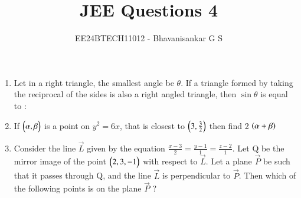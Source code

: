\documentclass[journal,12pt,onecolumn]{IEEEtran}
\theoremstyle{remark}
\begin{document}

\vspace{3cm}

\title{JEE Questions 4}
\author{EE24BTECH11012 - Bhavanisankar G S}
\maketitle
\newpage
\bigskip

\renewcommand{\thefigure}{\theenumi}
\renewcommand{\thetable}{\theenumi}
\begin{enumerate}

 \item Let in a right triangle, the smallest angle be $\theta$. If a triangle formed by taking the reciprocal of the sides is also a right angled triangle, then $\sin{\theta}$ is equal to :
	 \begin{enumerate}
	 \end{enumerate}
 \item If $\begin{pmatrix}\alpha , \beta\end{pmatrix}$ is a point on $y^2=6x$, that is closest to $\begin{pmatrix}3,\frac{3}{2}\end{pmatrix}$ then find 2 $ \left(\alpha+\beta\right) $
		\begin{enumerate}
				\begin{multicols}{4}
				\item 6
				\item 9
				\item 7
				\item 5
				\end{multicols}
		\end{enumerate}
 \item Consider the line $\vec{L}$ given by the equation $\frac{x-3}{2} = \frac{y-1}{1} = \frac{z-2}{1}$. Let Q be the mirror image of the point $\begin{pmatrix}2,3,-1\end{pmatrix}$ with respect to $\vec{L}$. Let a plane $\vec{P}$ be such that it passes through Q, and the line $\vec{L}$ is perpendicular to $\vec{P}$. Then which of the following points is on the plane $\vec{P}$ ?
	 \begin{enumerate}
			 \begin{multicols}{4}
			 \item $\myvec{-1,1,2}$
			 \item $\myvec{1,1,1}$

\end{multicols}
\end{enumerate}
\end{enumerate}
\end{document}
